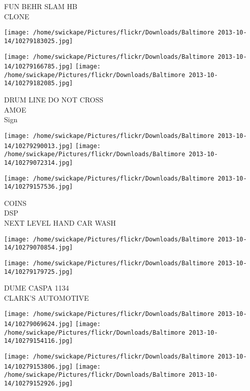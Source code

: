 \documentclass[10pt,letterpaper]{article}
\begin{document}
FUN BEHR SLAM HB\\
CLONE\\
\pagebreak

\texttt{[image: /home/swickape/Pictures/flickr/Downloads/Baltimore 2013-10-14/10279183025.jpg]}

\vspace{0.25in}
\texttt{[image: /home/swickape/Pictures/flickr/Downloads/Baltimore 2013-10-14/10279166785.jpg]}
\texttt{[image: /home/swickape/Pictures/flickr/Downloads/Baltimore 2013-10-14/10279182085.jpg]}

DRUM LINE DO NOT CROSS\\
AMOE\\
Sign\\
\pagebreak

\texttt{[image: /home/swickape/Pictures/flickr/Downloads/Baltimore 2013-10-14/10279290013.jpg]}
\texttt{[image: /home/swickape/Pictures/flickr/Downloads/Baltimore 2013-10-14/10279072314.jpg]}

\vspace{0.25in}
\texttt{[image: /home/swickape/Pictures/flickr/Downloads/Baltimore 2013-10-14/10279157536.jpg]}

COINS\\
DSP\\
NEXT LEVEL HAND CAR WASH\\
\pagebreak

\texttt{[image: /home/swickape/Pictures/flickr/Downloads/Baltimore 2013-10-14/10279070854.jpg]}

\vspace{0.25in}
\texttt{[image: /home/swickape/Pictures/flickr/Downloads/Baltimore 2013-10-14/10279179725.jpg]}

DUME CASPA 1134\\
CLARK'S AUTOMOTIVE\\
\pagebreak

\texttt{[image: /home/swickape/Pictures/flickr/Downloads/Baltimore 2013-10-14/10279069624.jpg]}
\texttt{[image: /home/swickape/Pictures/flickr/Downloads/Baltimore 2013-10-14/10279154116.jpg]}

\texttt{[image: /home/swickape/Pictures/flickr/Downloads/Baltimore 2013-10-14/10279153806.jpg]}
\texttt{[image: /home/swickape/Pictures/flickr/Downloads/Baltimore 2013-10-14/10279152926.jpg]}
\end{document}
